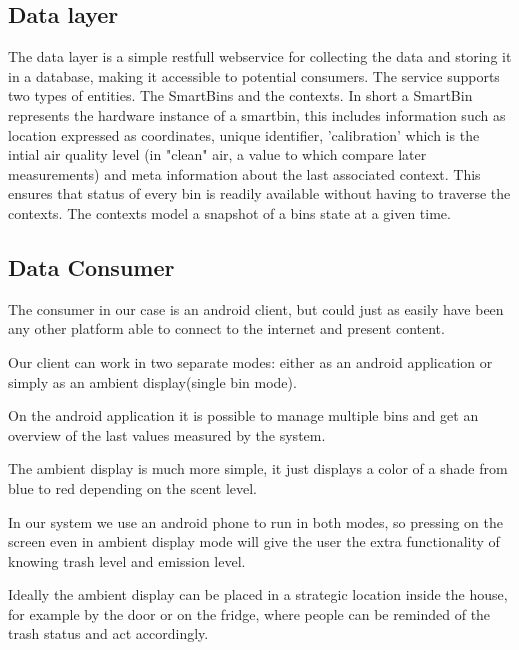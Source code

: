 \subsection{Data layer}
The data layer is a simple restfull webservice for collecting the data and storing it in a database, making it accessible to potential consumers.
The service supports two types of entities. The SmartBins and the contexts.
In short a SmartBin represents the hardware instance of a smartbin, this includes information such as location expressed as coordinates, unique identifier, 'calibration' which is the intial air quality level (in "clean" air, a value to which compare later measurements) and meta information about the last associated context.
This ensures that status of every bin is readily available without having to traverse the contexts.
The contexts model a snapshot of a bins state at a given time.

\subsection{Data Consumer}
The consumer in our case is an android client, but could just as easily have been any other platform able to connect to the internet and present content.

Our client can work in two separate modes: either as an android application or simply as an ambient display(single bin mode).

On the android application it is possible to manage multiple bins and get an overview of the last values measured by the system.

The ambient display is much more simple, it just displays a color of a shade from blue to red depending on the scent level.

In our system we use an android phone to run in both modes, so pressing on the screen even in ambient display mode will give the user the extra functionality of knowing trash level and emission level.

Ideally the ambient display can be placed in a strategic location inside the house, for example by the door or on the fridge, where people can be reminded of the trash status and act accordingly.